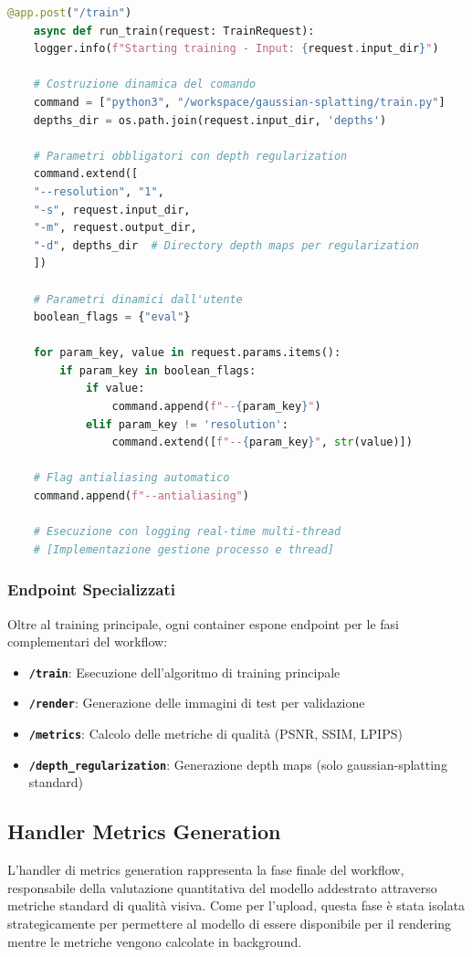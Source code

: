 \begin{lstlisting}[language=python, caption=Costruzione dinamica comando di training]
	@app.post("/train")
	async def run_train(request: TrainRequest):
	logger.info(f"Starting training - Input: {request.input_dir}")
	
	# Costruzione dinamica del comando
	command = ["python3", "/workspace/gaussian-splatting/train.py"]
	depths_dir = os.path.join(request.input_dir, 'depths')
	
	# Parametri obbligatori con depth regularization
	command.extend([
	"--resolution", "1",
	"-s", request.input_dir,
	"-m", request.output_dir,
	"-d", depths_dir  # Directory depth maps per regularization
	])
	
	# Parametri dinamici dall'utente
	boolean_flags = {"eval"}
	
	for param_key, value in request.params.items():
		if param_key in boolean_flags:
			if value:
				command.append(f"--{param_key}")
			elif param_key != 'resolution':
				command.extend([f"--{param_key}", str(value)])
	
	# Flag antialiasing automatico
	command.append(f"--antialiasing")
	
	# Esecuzione con logging real-time multi-thread
	# [Implementazione gestione processo e thread]
\end{lstlisting}

\subsubsection{Endpoint Specializzati}

Oltre al training principale, ogni container espone endpoint per le fasi complementari del workflow:

\begin{itemize}
	\item \textbf{\texttt{/train}}: Esecuzione dell'algoritmo di training principale
	\item \textbf{\texttt{/render}}: Generazione delle immagini di test per validazione
	\item \textbf{\texttt{/metrics}}: Calcolo delle metriche di qualità (PSNR, SSIM, LPIPS)
	\item \textbf{\texttt{/depth\_regularization}}: Generazione depth maps (solo gaussian-splatting standard)
\end{itemize}

\subsection{Handler Metrics Generation}
L'handler di metrics generation rappresenta la fase finale del workflow, responsabile della valutazione quantitativa del modello addestrato attraverso metriche standard di qualità visiva. Come per l'upload, questa fase è stata isolata strategicamente per permettere al modello di essere disponibile per il rendering mentre le metriche vengono calcolate in background.
